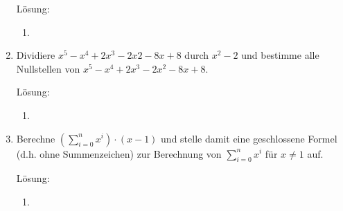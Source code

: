 \documentclass[../main.tex]{subfiles}
\begin{document}
\begin{enumerate}
	      Lösung:
	      \begin{enumerate}
		      \item
	      \end{enumerate}
	\item Dividiere \(
	      x^5 - x^4 + 2x^3 -2x2 -8x +8
	      \) durch \(
	      x^2 - 2
	      \) und bestimme alle Nullstellen von \(
	      x^5 - x^4 + 2x^3 - 2x^2 - 8x +8
	      \).

	      Lösung:
	      \begin{enumerate}
		      \item
	      \end{enumerate}
	\item Berechne \(
	      (\sum_{i = 0}^{n} x^i) \cdot ( x -1)
	      \) und stelle damit eine geschlossene Formel (d.h. ohne Summenzeichen) zur Berechnung von \(
	      \sum_{ i = 0}^{n} x^i
	      \) für \(
	      x \neq 1
	      \) auf.

	      Lösung:
	      \begin{enumerate}
		      \item
	      \end{enumerate}
\end{enumerate}
\end{document}

